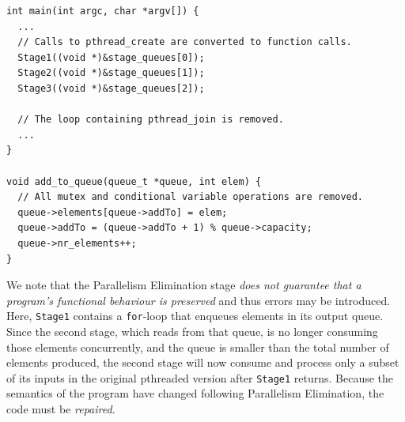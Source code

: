 \begin{lstlisting}[caption=Simple Pipeline Code with Parallelism Removed, label=lst:pipeParRem]
int main(int argc, char *argv[]) {
  ...
  // Calls to pthread_create are converted to function calls.
  Stage1((void *)&stage_queues[0]);
  Stage2((void *)&stage_queues[1]);
  Stage3((void *)&stage_queues[2]);
  
  // The loop containing pthread_join is removed.
  ...
}

void add_to_queue(queue_t *queue, int elem) {
  // All mutex and conditional variable operations are removed.
  queue->elements[queue->addTo] = elem;
  queue->addTo = (queue->addTo + 1) % queue->capacity;
  queue->nr_elements++;
}
\end{lstlisting}

\noindent
%
%
We note that the Parallelism Elimination stage \emph{does not guarantee that a program's functional behaviour is preserved} and thus errors may be introduced.
%
%
Here, \lstinline|Stage1| contains a \lstinline|for|-loop that enqueues elements in its output queue. Since the second stage, which reads from that queue, is no longer consuming those elements concurrently, and the queue is smaller than the total number of elements produced, the second stage will now consume and process only a subset of its inputs in the original pthreaded version after \lstinline|Stage1| returns.
%
%
%
Because the semantics of the program have changed following Parallelism Elimination, the code must be \emph{repaired}.



